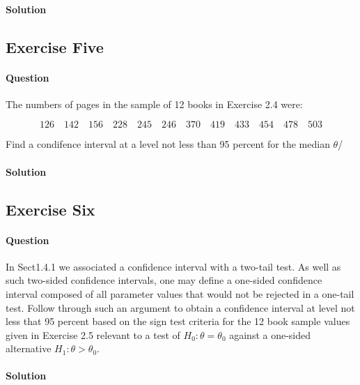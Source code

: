 \documentclass[]{article}
\let\oldparagraph\paragraph
\renewcommand{\paragraph}[1]{\oldparagraph{#1}\mbox{}}
\begin{document}
\paragraph{Solution}\label{solution-3}

\subsection{Exercise Five}\label{exercise-five}

\paragraph{Question}\label{question-4}

The numbers of pages in the sample of 12 books in Exercise 2.4 were:

\[
  126\quad142\quad156\quad228\quad245\quad246\quad370\quad419\quad433\quad454\quad478\quad503
\]

Find a condifence interval at a level not less than 95 percent for the
median \(\theta\)/

\paragraph{Solution}\label{solution-4}

\subsection{Exercise Six}\label{exercise-six}

\paragraph{Question}\label{question-5}

In Sect1.4.1 we associated a confidence interval with a two-tail test.
As well as such two-sided confidence intervals, one may define a
one-sided confidence interval composed of all parameter values that
would not be rejected in a one-tail test. Follow through such an
argument to obtain a confidence interval at level not less that 95
percent based on the sign test criteria for the 12 book sample values
given in Exercise 2.5 relevant to a test of \(H_0: \theta = \theta_0\)
against a one-sided alternative \(H_1: \theta > \theta_0\).

\paragraph{Solution}\label{solution-5}
\end{document}
